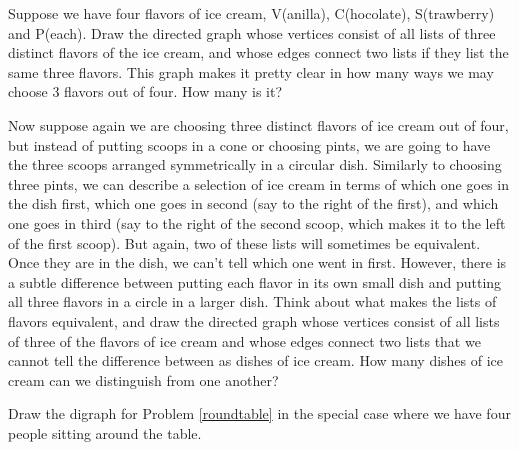\bp
\item Suppose we have four flavors of ice cream, V(anilla),
C(hocolate), S(trawberry) and P(each).  Draw the directed
graph whose vertices consist of all lists of three distinct
flavors of the ice cream, and whose edges connect two lists if
they list the same three flavors.  This graph makes it
pretty clear in how many ways we may choose 3 flavors
out of four.  How many is it?\label{fourchoosethree}

\itemi Now suppose again we are choosing three distinct flavors of
ice cream out of four, but instead of putting scoops in a cone or
choosing pints, we are going to have the three scoops arranged
symmetrically in a circular dish.  Similarly to choosing three
pints, we can describe a selection of ice cream in terms of which
one goes in the dish first, which one goes in second (say to the
right of the first), and which one goes in third (say to the right
of the second scoop, which makes it to the left of the first
scoop).  But again, two of these lists will sometimes be
equivalent.  Once they are in the dish, we can't tell which one
went in first.  However, there is a subtle difference between
putting each flavor in its own small dish and putting all three
flavors in a circle in a larger dish.  Think about what makes the
lists of flavors equivalent, and draw the directed graph whose
vertices consist of all lists of     three of the flavors of ice
cream and whose edges connect two lists that we cannot tell the
difference between as dishes of ice cream.  How many dishes of ice
cream can we distinguish from one another?\label{icecreaminadish}
\solution{\begin{center}
\mbox{\psfig{figure=icecreamindish.eps,%
}}\end{center}We can distinguish eight different dishes of ice
cream.}


\item Draw the digraph for Problem \ref{roundtable} in the
special case where we have four people sitting around the table.
\label{roundtablefour} 
\solution{\begin{center}
\mbox{\psfig{figure=4AROUNDATABLE.eps,%
}}\end{center}}
\ep

